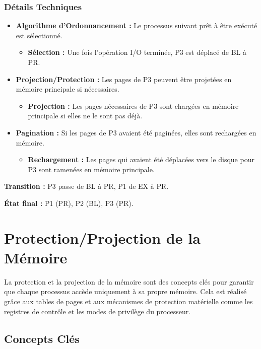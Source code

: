 \subsubsection*{Détails Techniques}

\begin{itemize}
    \item \textbf{Algorithme d'Ordonnancement :} Le processus suivant prêt à être exécuté est sélectionné.
    \begin{itemize}
        \item \textbf{Sélection :} Une fois l'opération I/O terminée, P3 est déplacé de BL à PR.
    \end{itemize}
    \item \textbf{Projection/Protection :} Les pages de P3 peuvent être projetées en mémoire principale si nécessaires.
    \begin{itemize}
        \item \textbf{Projection :} Les pages nécessaires de P3 sont chargées en mémoire principale si elles ne le sont pas déjà.
    \end{itemize}
    \item \textbf{Pagination :} Si les pages de P3 avaient été paginées, elles sont rechargées en mémoire.
    \begin{itemize}
        \item \textbf{Rechargement :} Les pages qui avaient été déplacées vers le disque pour P3 sont ramenées en mémoire principale.
    \end{itemize}
\end{itemize}

\textbf{Transition :} P3 passe de BL à PR, P1 de EX à PR.

\textbf{État final :} P1 (PR), P2 (BL), P3 (PR).

\section*{Protection/Projection de la Mémoire}

La protection et la projection de la mémoire sont des concepts clés pour garantir que chaque processus accède uniquement à sa propre mémoire. Cela est réalisé grâce aux tables de pages et aux mécanismes de protection matérielle comme les registres de contrôle et les modes de privilège du processeur.

\subsection*{Concepts Clés}

